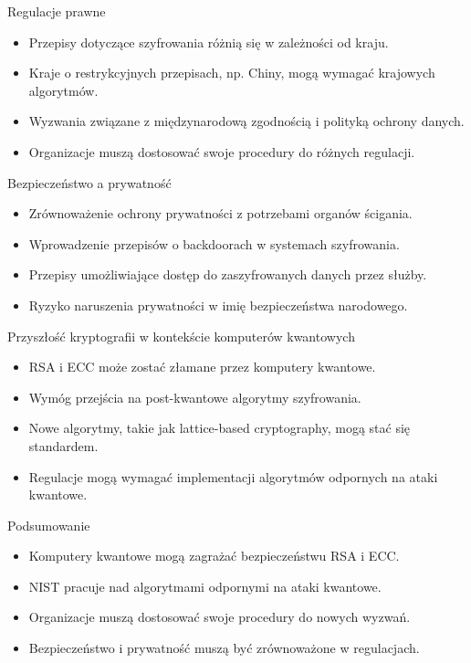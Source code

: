 \begin{frame}{Regulacje prawne}
    \begin{itemize}
            \item Przepisy dotyczące szyfrowania różnią się w zależności od kraju.
            \item Kraje o restrykcyjnych przepisach, np. Chiny, mogą wymagać krajowych algorytmów.
            \item Wyzwania związane z międzynarodową zgodnością i polityką ochrony danych.
            \item Organizacje muszą dostosować swoje procedury do różnych regulacji.
    \end{itemize}
\end{frame}
\begin{frame}{Bezpieczeństwo a prywatność}
    \begin{itemize}
        \item Zrównoważenie ochrony prywatności z potrzebami organów ścigania.
        \item Wprowadzenie przepisów o backdoorach w systemach szyfrowania.
        \item Przepisy umożliwiające dostęp do zaszyfrowanych danych przez służby.
        \item Ryzyko naruszenia prywatności w imię bezpieczeństwa narodowego.
    \end{itemize}
\end{frame}
\begin{frame}{Przyszłość kryptografii w kontekście komputerów kwantowych}
    \begin{itemize}
    \item RSA i ECC może zostać złamane przez komputery kwantowe.
    \item Wymóg przejścia na post-kwantowe algorytmy szyfrowania.
    \item Nowe algorytmy, takie jak lattice-based cryptography, mogą stać się standardem.
    \item Regulacje mogą wymagać implementacji algorytmów odpornych na ataki kwantowe.
    \end{itemize}
\end{frame}
\begin{frame}{Podsumowanie}
    \begin{itemize}
        \item Komputery kwantowe mogą zagrażać bezpieczeństwu RSA i ECC.
        \item NIST pracuje nad algorytmami odpornymi na ataki kwantowe.
        \item Organizacje muszą dostosować swoje procedury do nowych wyzwań.
        \item Bezpieczeństwo i prywatność muszą być zrównoważone w regulacjach.
    \end{itemize}
\end{frame}

